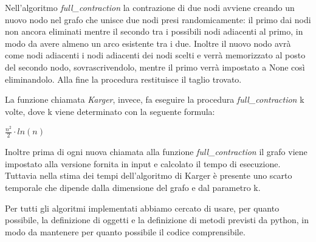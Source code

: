 Nell'algoritmo \textit{full\_contraction} la contrazione di due nodi avviene creando un nuovo nodo nel grafo che unisce due nodi presi randomicamente: il primo dai nodi non ancora eliminati mentre il secondo tra i possibili nodi adiacenti al primo, in modo da avere almeno un arco esistente tra i due.
Inoltre il nuovo nodo avrà come nodi adiacenti i nodi adiacenti dei nodi scelti e verrà memorizzato al posto del secondo nodo, sovrascrivendolo, mentre il primo verrà impostato a None così eliminandolo.
Alla fine la procedura restituisce il taglio trovato.

La funzione chiamata \textit{Karger}, invece, fa eseguire la procedura \textit{full\_contraction} k volte, dove k viene determinato con la seguente formula: 

\centerline{\(\frac{n^{2}}{2}\cdot ln(n)\)}

Inoltre prima di ogni nuova chiamata alla funzione \textit{full\_contraction} il grafo viene impostato alla versione fornita in input e calcolato il tempo di esecuzione. Tuttavia nella stima dei tempi dell'algoritmo di Karger è presente uno scarto temporale che dipende dalla dimensione del grafo e dal parametro k.

Per tutti gli algoritmi implementati abbiamo cercato di usare, per quanto possibile, la definizione di oggetti e la definizione di metodi previsti da python, in modo da mantenere per quanto possibile il codice comprensibile.